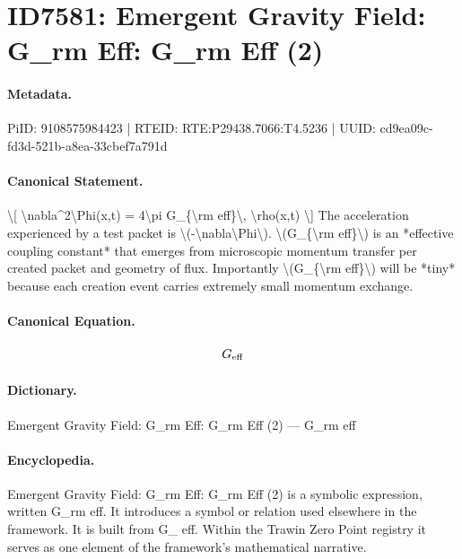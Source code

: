 \section*{ID7581: Emergent Gravity Field: G\_rm Eff: G\_rm Eff (2)}
\paragraph{Metadata.}
PiID: 9108575984423 | RTEID: RTE:P29438.7066:T4.5236 | UUID: cd9ea09c-fd3d-521b-a8ea-33cbef7a791d

\paragraph{Canonical Statement.}
\textbackslash{}[ \textbackslash{}nabla\textasciicircum{}2\textbackslash{}Phi(x,t) = 4\textbackslash{}pi G\_\{\textbackslash{}rm eff\}\textbackslash{}, \textbackslash{}rho(x,t) \textbackslash{}] The acceleration experienced by a test packet is \textbackslash{}(-\textbackslash{}nabla\textbackslash{}Phi\textbackslash{}). \textbackslash{}(G\_\{\textbackslash{}rm eff\}\textbackslash{}) is an *effective coupling constant* that emerges from microscopic momentum transfer per created packet and geometry of flux. Importantly \textbackslash{}(G\_\{\textbackslash{}rm eff\}\textbackslash{}) will be *tiny* because each creation event carries extremely small momentum exchange.

\paragraph{Canonical Equation.}
\[
G_{\rm eff}
\]

\paragraph{Dictionary.}
Emergent Gravity Field: G\_rm Eff: G\_rm Eff (2) — G\_rm eff

\paragraph{Encyclopedia.}
Emergent Gravity Field: G\_rm Eff: G\_rm Eff (2) is a symbolic expression, written G\_rm eff. It introduces a symbol or relation used elsewhere in the framework. It is built from G\_ eff. Within the Trawin Zero Point registry it serves as one element of the framework's mathematical narrative.
